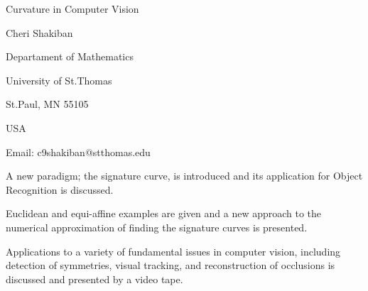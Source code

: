 

\centerline{Curvature in Computer Vision}

\vskip 0.3cm

\centerline{Cheri Shakiban}
\centerline{Departament of Mathematics}
\centerline{University of St.Thomas} 
\centerline{St.Paul, MN 55105}
\centerline{USA}
\centerline{Email: c9shakiban@stthomas.edu}

\vskip 0.3cm
 
A new paradigm; the signature curve,  is introduced
and its application for  Object Recognition is discussed.

Euclidean and equi-affine examples are given and
a new approach to the numerical approximation of finding
the signature curves is presented.

Applications to a variety of fundamental issues
in computer vision, including detection of symmetries,
visual tracking, and reconstruction of occlusions is discussed
and presented by a video tape.


